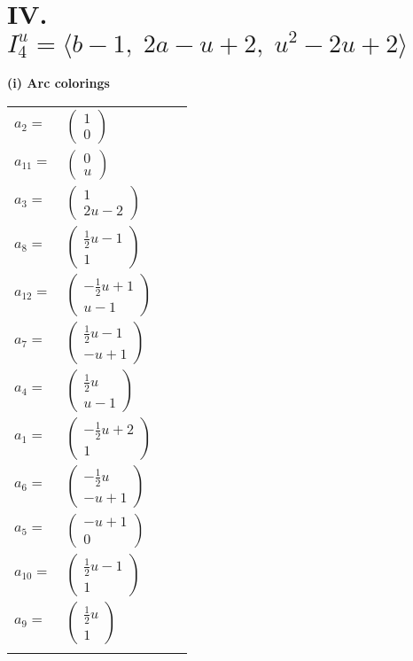 \documentclass[1p]{elsarticle_modified}
\theoremstyle{definition}
\begin{document}
\centering \section*{IV. $I^u_{4}= \langle b-1,\;2 a- u+2,\;u^2-2 u+2 \rangle$}
\flushleft \textbf{(i) Arc colorings}\\
\begin{tabular}{m{7pt} m{180pt} m{7pt} m{180pt} }
\flushright $a_{2}=$&$\begin{pmatrix}1\\0\end{pmatrix}$ \\
\flushright $a_{11}=$&$\begin{pmatrix}0\\u\end{pmatrix}$ \\
\flushright $a_{3}=$&$\begin{pmatrix}1\\2 u-2\end{pmatrix}$ \\
\flushright $a_{8}=$&$\begin{pmatrix}\frac{1}{2} u-1\\1\end{pmatrix}$ \\
\flushright $a_{12}=$&$\begin{pmatrix}-\frac{1}{2} u+1\\u-1\end{pmatrix}$ \\
\flushright $a_{7}=$&$\begin{pmatrix}\frac{1}{2} u-1\\- u+1\end{pmatrix}$ \\
\flushright $a_{4}=$&$\begin{pmatrix}\frac{1}{2} u\\u-1\end{pmatrix}$ \\
\flushright $a_{1}=$&$\begin{pmatrix}-\frac{1}{2} u+2\\1\end{pmatrix}$ \\
\flushright $a_{6}=$&$\begin{pmatrix}-\frac{1}{2} u\\- u+1\end{pmatrix}$ \\
\flushright $a_{5}=$&$\begin{pmatrix}- u+1\\0\end{pmatrix}$ \\
\flushright $a_{10}=$&$\begin{pmatrix}\frac{1}{2} u-1\\1\end{pmatrix}$ \\
\flushright $a_{9}=$&$\begin{pmatrix}\frac{1}{2} u\\1\end{pmatrix}$\\&\end{tabular}
\end{document}
